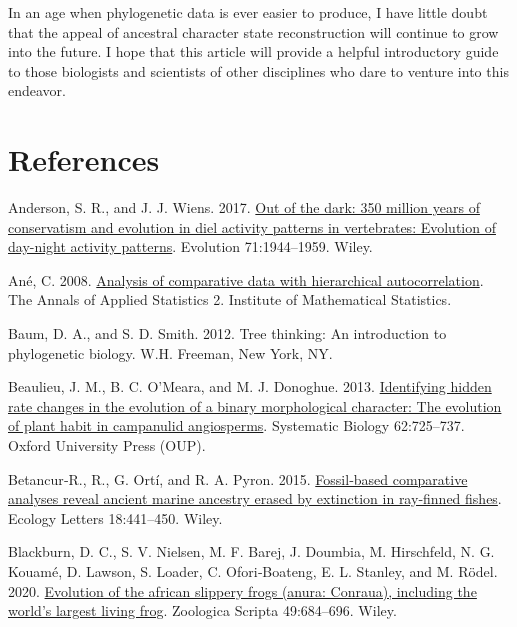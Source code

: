 \documentclass{article}
\newlength{\cslhangindent}
\newenvironment{CSLReferences}[2] %
 {\begin{list}{}{%
  \setlength{\itemindent}{0pt}
  \setlength{\leftmargin}{0pt}
  \setlength{\parsep}{0pt}
  \ifodd #1
   \setlength{\leftmargin}{\cslhangindent}
   \setlength{\itemindent}{-1\cslhangindent}
  \fi
  \setlength{\itemsep}{#2\baselineskip}}}
 {\end{list}}
\begin{document}
In an age when phylogenetic data is ever easier to produce, I have little doubt that the appeal of ancestral character state reconstruction will continue to grow into the future. I hope that this article will provide a helpful introductory guide to those biologists and scientists of other disciplines who dare to venture into this endeavor.

\section*{References}\label{references}

\label{refs}
\begin{CSLReferences}{1}{0}
Anderson, S. R., and J. J. Wiens. 2017. \href{https://doi.org/10.1111/evo.13284}{Out of the dark: 350 million years of conservatism and evolution in diel activity patterns in vertebrates: Evolution of day-night activity patterns}. Evolution 71:1944--1959. Wiley.

Ané, C. 2008. \href{https://doi.org/10.1214/08-aoas173}{Analysis of comparative data with hierarchical autocorrelation}. The Annals of Applied Statistics 2. Institute of Mathematical Statistics.

Baum, D. A., and S. D. Smith. 2012. Tree thinking: An introduction to phylogenetic biology. W.H. Freeman, New York, NY.

Beaulieu, J. M., B. C. O'Meara, and M. J. Donoghue. 2013. \href{https://doi.org/10.1093/sysbio/syt034}{Identifying hidden rate changes in the evolution of a binary morphological character: The evolution of plant habit in campanulid angiosperms}. Systematic Biology 62:725--737. Oxford University Press (OUP).

Betancur‐R., R., G. Ortí, and R. A. Pyron. 2015. \href{https://doi.org/10.1111/ele.12423}{Fossil‐based comparative analyses reveal ancient marine ancestry erased by extinction in ray‐finned fishes}. Ecology Letters 18:441--450. Wiley.

Blackburn, D. C., S. V. Nielsen, M. F. Barej, J. Doumbia, M. Hirschfeld, N. G. Kouamé, D. Lawson, S. Loader, C. Ofori‐Boateng, E. L. Stanley, and M. Rödel. 2020. \href{https://doi.org/10.1111/zsc.12447}{Evolution of the african slippery frogs (anura: Conraua), including the world's largest living frog}. Zoologica Scripta 49:684--696. Wiley.


\end{CSLReferences}
\end{document}

